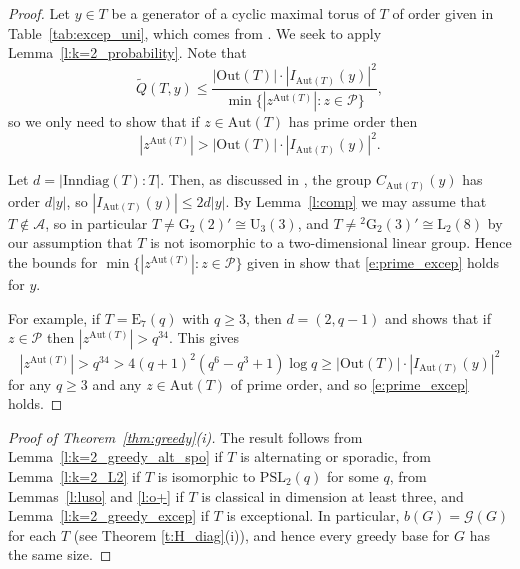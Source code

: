 \documentclass[twoside,a4paper,reqno,11pt]{amsart}
\newcommand{\<}{\langle}
\renewcommand{\>}{\rangle}
\newcommand{\leqs}{\leqslant}
\newcommand{\geqs}{\geqslant}
\newcommand{\Aut}{\mathrm{Aut}}
\newcommand{\Out}{\mathrm{Out}}
\newcommand{\PSL}{\mathrm{PSL}}
\newcommand{\LL}{\mathrm{L}}
\newcommand{\UU}{\mathrm{U}}
\theoremstyle{definition}
\begin{document}
\begin{proof}
    Let $y\in T$ be a generator of a cyclic maximal torus of $T$ of order given in Table~\ref{tab:excep_uni}, which comes from \cite[Table~2]{LL_chiral}.
    We seek to apply Lemma~\ref{l:k=2_probability}. Note that
    \begin{equation*}
        \widetilde{Q}(T,y) \leqslant \frac{|\mathrm{Out}(T)|\cdot |I_{\mathrm{Aut}(T)}(y)|^2}{\min\{|z^{\mathrm{Aut}(T)}|: z\in \mathcal{P}\}},
    \end{equation*}
    so we only need to show that if $z \in \Aut(T)$ has prime order then
    \begin{equation}
    \label{e:prime_excep}
        |z^{\Aut(T)}| > |\mathrm{Out}(T)|\cdot |I_{\mathrm{Aut}(T)}(y)|^2.
    \end{equation}

    Let $d = |\mathrm{Inndiag}(T):T|$. Then, as discussed in \cite[Section 3]{LL_chiral}, the group $C_{\Aut(T)}(y)$ %
    has order $d|y|$, so $|I_{\Aut(T)}(y)|\leqs 2d|y|$.  By Lemma~\ref{l:comp} we may assume that $T \not\in \mathcal{A}$, so in particular $T \neq \mathrm{G}_2(2)' \cong \UU_3(3)$, 
    and $T \neq  {^2}\mathrm{G}_2(3)' \cong \LL_2(8)$ by our assumption that $T$ is not isomorphic to a two-dimensional linear group. Hence the bounds for $\min\{|z^{\mathrm{Aut}(T)}|:z\in \mathcal{P}\}$ given in \cite[Proposition 2.11]{BT_extremely} show that \eqref{e:prime_excep} holds for $y$.    
    
    For example, if $T = \mathrm{E}_7(q)$ with $q\geqs 3$, then $d = (2,q-1)$ and \cite[Proposition 2.11]{BT_extremely} shows that if $z \in \mathcal{P}$ then $|z^{\Aut(T)}| > q^{34}$. This gives 
    \begin{equation*}
        |z^{\Aut(T)}| > q^{34} > 4(q+1)^2(q^6-q^3+1)\log q \geqs |\Out(T)|\cdot |I_{\Aut(T)}(y)|^2
    \end{equation*}
    for any $q\geqs 3$ and any $z\in \Aut(T)$ of prime order, and so \eqref{e:prime_excep} holds. 
\end{proof}


\begin{proof}[Proof of Theorem~\ref{thm:greedy}(i)]
    The result follows from Lemma~\ref{l:k=2_greedy_alt_spo} if $T$ is alternating or sporadic, from Lemma~\ref{l:k=2_L2} if $T$ is isomorphic to $\PSL_2(q)$ for some $q$, from Lemmas~\ref{l:luso} and \ref{l:o+} if $T$ is classical in dimension at least three, and  Lemma~\ref{l:k=2_greedy_excep} if $T$ is exceptional. In particular,  $b(G) = \mathcal{G}(G)$ for each $T$ (see Theorem \ref{t:H_diag}(i)), and hence every greedy base for $G$ has the same size.
\end{proof}
\end{document}
